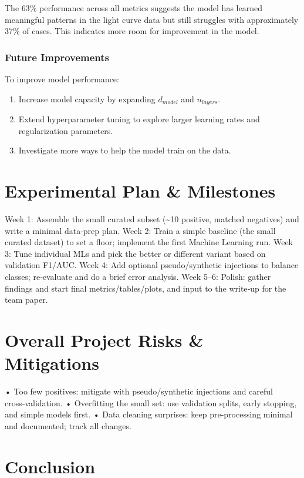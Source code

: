 \documentclass[letterpaper]{article} %
\begin{document}
The 63\% performance across all metrics suggests the model has learned meaningful patterns in the light curve data but still struggles with approximately 37\% of cases. This indicates more room for improvement in the model. 

\subsubsection*{Future Improvements}

To improve model performance:
\begin{enumerate}
    \item Increase model capacity by expanding \(d_{model}\) and \(n_{layers}\).
    \item Extend hyperparameter tuning to explore larger learning rates and regularization parameters.
    \item Investigate more ways to help the model train on the data.
\end{enumerate}


\section*{Experimental Plan \& Milestones}
Week 1: Assemble the small curated subset (\textasciitilde{}10 positive, matched negatives) and write a minimal data-prep plan.
Week 2: Train a simple baseline (the small curated dataset) to set a floor; implement the first Machine Learning run.
Week 3: Tune individual MLs and pick the better or different variant based on validation F1/AUC.
Week 4: Add optional pseudo/synthetic injections to balance classes; re‑evaluate and do a brief error analysis.
Week 5–6: Polish: gather findings and start final metrics/tables/plots, and input to the write‑up for the team paper.

\section*{Overall Project Risks \& Mitigations}
• Too few positives: mitigate with pseudo/synthetic injections and careful cross‑validation.
• Overfitting the small set: use validation splits, early stopping, and simple models first.
• Data cleaning surprises: keep pre-processing minimal and documented; track all changes.

\section*{Conclusion}
\end{document}
